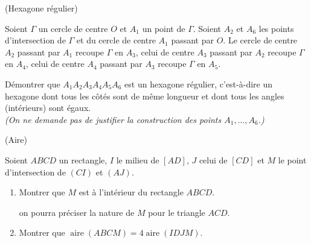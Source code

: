 \documentclass[a4paper,12pt,reqno]{amsart}
\DeclareMathOperator{\aire}{aire}
\begin{document}
\begin{exo} (Hexagone régulier)

  Soient $\Gamma$ un cercle de centre $O$ et $A_1$ un point de $\Gamma$. Soient $A_2$ et $A_6$ les points d'intersection de $\Gamma$ et du cercle de centre $A_1$ passant par $O$. Le cercle de centre $A_2$ passant par $A_1$ recoupe $\Gamma$ en $A_3$, celui de centre $A_3$ passant par $A_2$ recoupe $\Gamma$ en $A_4$, celui de centre $A_4$ passant par $A_3$ recoupe $\Gamma$ en $A_5$.

  Démontrer que $A_1 A_2 A_3 A_4 A_5 A_6$ est un hexagone régulier, c'est-à-dire un hexagone dont tous les côtés sont de même longueur et dont tous les angles (intérieurs) sont égaux.\\
  \emph{(On ne demande pas de justifier la construction des points $A_1,\ldots,A_6$.)}

\end{exo}

\begin{solution}


\end{solution}


\begin{exo} (Aire)

  Soient $ABCD$ un rectangle, $I$ le milieu de $[AD]$, $J$ celui de $[CD]$ et $M$ le point d'intersection de $(CI)$ et $(AJ)$.
  \begin{enumerate}
    \item Montrer que $M$ est à l'intérieur du rectangle $ABCD$.\\
    \begin{indication}
      on pourra préciser la nature de $M$ pour le triangle $ACD$.
    \end{indication}
    \item Montrer que $\aire(ABCM)=4\aire(IDJM)$.
  \end{enumerate}

\end{exo}
\end{document}
